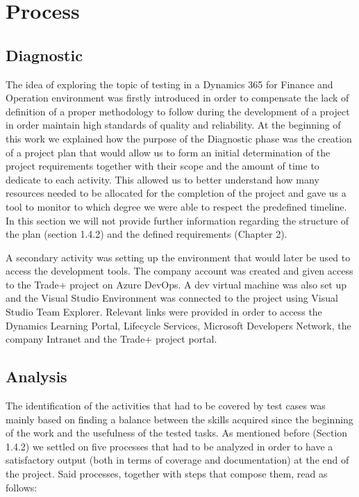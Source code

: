 \chapter{Process}

\section{Diagnostic} 

The idea of exploring the topic of testing in a Dynamics 365 for Finance and Operation environment was firstly introduced in order to compensate the lack of definition of a proper methodology to follow during the development of a project in order maintain high standards of quality and reliability. 
At the beginning of this work we explained how the purpose of the Diagnostic phase was the creation of a project plan that would allow us to form an initial determination of the project requirements together with their scope and the amount of time to dedicate to each activity. This allowed us to better understand how many resources needed to be allocated for the completion of the project and gave us a tool to monitor to which degree we were able to respect the predefined timeline. In this section we will not provide further information regarding the structure of the plan (section 1.4.2) and the defined requirements (Chapter 2).

A secondary activity was setting up the environment that would later be used to access the development tools. The company account was created and given access to the Trade+ project on Azure DevOps. A dev virtual machine was also set up and the Visual Studio Environment was connected to the project using Visual Studio Team Explorer. Relevant links were provided in order to access the Dynamics Learning Portal, Lifecycle Services, Microsoft Developers Network, the company Intranet and the Trade+ project portal.

\section{Analysis} 

The identification of the activities that had to be covered by test cases was mainly based on finding a balance between the skills acquired since the beginning of the work and the usefulness of the tested tasks. As mentioned before (Section 1.4.2) we settled on five processes that had to be analyzed in order to have a satisfactory output (both in terms of coverage and documentation) at the end of the project. Said processes, together with steps that compose them, read as follows:

